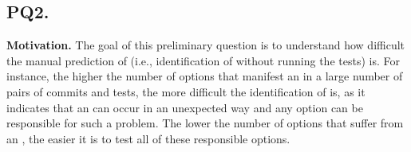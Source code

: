 \subsection*{\textbf{PQ2. \PQII}}

\noindent \textbf{Motivation.}
The goal of this preliminary question is to understand how difficult the manual prediction of \inconsistent (i.e., identification of \inconsistent without running the tests) is. For instance, the higher the number of options that manifest an \inconsistent in a large number of pairs of commits and tests, the more difficult the identification of \inconsistent is, as it indicates that an \inconsistent can occur in an unexpected way and any option can be responsible for such a problem. %
The lower the number of options that suffer from an \inconsistent, the easier it is to test all of these \inconsistent responsible options. 

